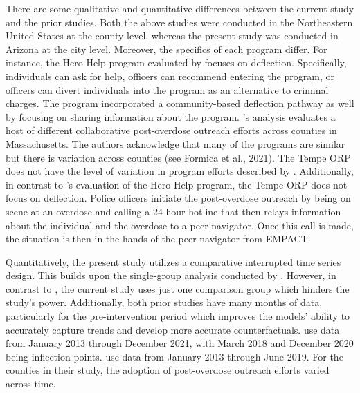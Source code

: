 There are some qualitative and quantitative differences between the current study and the prior studies. Both the above studies were conducted in the Northeastern United States at the county level, whereas the present study was conducted in Arizona at the city level. Moreover, the specifics of each program differ. For instance, the Hero Help program evaluated by \textcite{donnelly_law_2022} focuses on deflection. Specifically, individuals can ask for help, officers can recommend entering the program, or officers can divert individuals into the program as an alternative to criminal charges. The program incorporated a community-based deflection pathway as well by focusing on sharing information about the program. \textcite{xuan_association_2023}'s analysis evaluates a host of different collaborative post-overdose outreach efforts across counties in Massachusetts. The authors acknowledge that many of the programs are similar but there is variation across counties (see Formica et al., 2021). The Tempe ORP does not have the level of variation in program efforts described by \textcite{xuan_association_2023}. Additionally, in contrast to \textcite{donnelly_law_2022}'s evaluation of the Hero Help program, the Tempe ORP does not focus on deflection. Police officers initiate the post-overdose outreach by being on scene at an overdose and calling a 24-hour hotline that then relays information about the individual and the overdose to a peer navigator. Once this call is made, the situation is then in the hands of the peer navigator from EMPACT. 

Quantitatively, the present study utilizes a comparative interrupted time series design. This builds upon the single-group analysis conducted by \textcite{donnelly_law_2022}. However, in contrast to \textcite{xuan_association_2023}, the current study uses just one comparison group which hinders the study's power. Additionally, both prior studies have many months of data, particularly for the pre-intervention period which improves the models' ability to accurately capture trends and develop more accurate counterfactuals. \textcite{donnelly_law_2022} use data from January 2013 through December 2021, with March 2018 and December 2020 being inflection points. \textcite{xuan_association_2023} use data from January 2013 through June 2019. For the counties in their study, the adoption of post-overdose outreach efforts varied across time.

